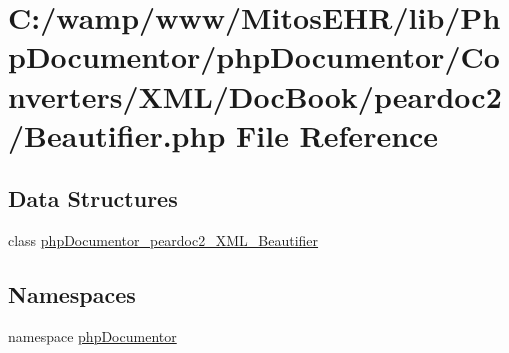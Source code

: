 \hypertarget{_beautifier_8php}{\section{\-C\-:/wamp/www/\-Mitos\-E\-H\-R/lib/\-Php\-Documentor/php\-Documentor/\-Converters/\-X\-M\-L/\-Doc\-Book/peardoc2/\-Beautifier.php \-File \-Reference}
\label{_beautifier_8php}
}
\subsection*{\-Data \-Structures}
\begin{DoxyCompactItemize}
\item 
class \hyperlink{classphp_documentor__peardoc2___x_m_l___beautifier}{php\-Documentor\-\_\-peardoc2\-\_\-\-X\-M\-L\-\_\-\-Beautifier}
\end{DoxyCompactItemize}
\subsection*{\-Namespaces}
\begin{DoxyCompactItemize}
\item 
namespace \hyperlink{namespacephp_documentor}{php\-Documentor}
\end{DoxyCompactItemize}
